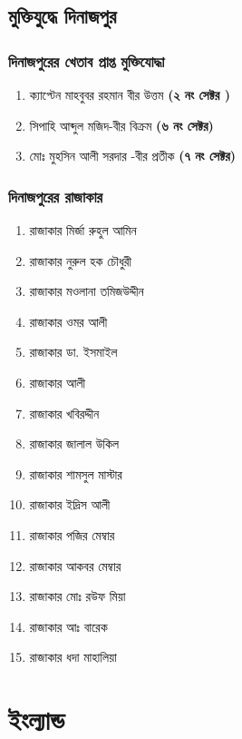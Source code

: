 \documentclass[11pt]{article}
\begin{document}
\subsection{মুক্তিযুদ্ধে দিনাজপুর}
\label{sec:orgd7c1ac4}

\subsubsection{দিনাজপুরের খেতাব প্রাপ্ত মুক্তিযোদ্ধা}
\label{sec:org5f1b946}

\begin{enumerate}
\item ক্যাপ্টেন মাহবুবর রহমান বীর উত্তম \textbf{(২ নং সেক্টর )}
\item সিপাহি আব্দুল মজিদ-বীর বিক্রম \textbf{(৬ নং সেক্টর)}
\item মোঃ মুহসিন আলী সরদার -বীর প্রতীক \textbf{(৭ নং সেক্টর)}
\end{enumerate}

\subsubsection{দিনাজপুরের রাজাকার}
\label{sec:org31edeec}

\begin{enumerate}
\item রাজাকার মির্জা রুহুল আমিন
\item রাজাকার নুরুল হক চৌধুরী
\item রাজাকার মওলানা তমিজউদ্দীন
\item রাজাকার ওমর আলী
\item রাজাকার ডা. ইসমাইল
\item রাজাকার আলী
\item রাজাকার খবিরদ্দীন
\item রাজাকার জালাল উকিল
\item রাজাকার শামসুল মাস্টার
\item রাজাকার ইদ্রিস আলী
\item রাজাকার পজির মেম্বার
\item রাজাকার আকবর মেম্বার
\item রাজাকার মোঃ রউফ মিয়া
\item রাজাকার আঃ বারেক
\item রাজাকার ধদা মাহালিয়া
\end{enumerate}

\section{ইংল্যান্ড}
\label{sec:org4e31ac0}
\end{document}
